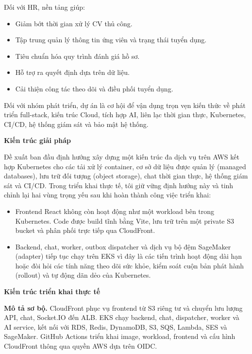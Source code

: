 Đối với HR, nền tảng giúp:

\begin{itemize}
\tightlist
\item
  Giảm bớt thời gian xử lý CV thủ công.
\item
  Tập trung quản lý thông tin ứng viên và trạng thái tuyển dụng.
\item
  Tiêu chuẩn hóa quy trình đánh giá hồ sơ.
\item
  Hỗ trợ ra quyết định dựa trên dữ liệu.
\item
  Cải thiện công tác theo dõi và điều phối tuyển dụng.
\end{itemize}

Đối với nhóm phát triển, dự án là cơ hội để vận dụng trọn vẹn kiến thức
về phát triển full-stack, kiến trúc Cloud, tích hợp AI, liên lạc thời
gian thực, Kubernetes, CI/CD, hệ thống giám sát và bảo mật hệ thống.

\vspace{0.5em}\noindent\textbf{Kiến trúc giải
pháp}\par

Đề xuất ban đầu định hướng xây dựng một kiến trúc đa dịch vụ trên AWS
kết hợp Kubernetes cho các tải xử lý container, cơ sở dữ liệu được quản
lý (managed databases), lưu trữ đối tượng (object storage), chat thời
gian thực, hệ thống giám sát và CI/CD. Trong triển khai thực tế, tôi giữ
vững định hướng này và tinh chỉnh lại hai vùng trọng yếu sau khi hoàn
thành công việc triển khai:

\begin{itemize}
\tightlist
\item
  Frontend React không còn hoạt động như một workload bên trong
  Kubernetes. Code được build tĩnh bằng Vite, lưu trữ trên một private
  S3 bucket và phân phối trực tiếp qua CloudFront.
\item
  Backend, chat, worker, outbox dispatcher và dịch vụ bộ đệm SageMaker
  (adapter) tiếp tục chạy trên EKS vì đây là các tiến trình hoạt động
  dài hạn hoặc đòi hỏi các tính năng theo dõi sức khỏe, kiểm soát cuộn
  bản phát hành (rollout) và tự động dãn dẻo của Kubernetes.
\end{itemize}

\vspace{0.5em}\noindent\textbf{Kiến trúc triển khai thực
tế}\par

\textbf{Mô tả sơ bộ.} CloudFront phục vụ frontend từ S3 riêng tư và
chuyển lưu lượng API, chat, Socket.IO đến ALB. EKS chạy backend, chat,
dispatcher, worker và AI service, kết nối với RDS, Redis, DynamoDB, S3,
SQS, Lambda, SES và SageMaker. GitHub Actions triển khai image,
workload, frontend và cấu hình CloudFront thông qua quyền AWS dựa trên
OIDC.

